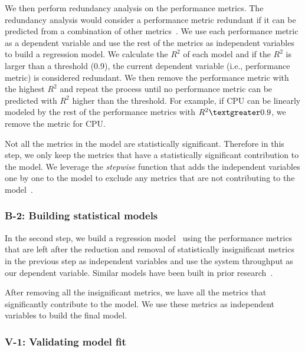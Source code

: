 \documentclass[smallextended]{svjour3}       %
\begin{document}
We then perform redundancy analysis on the performance metrics. The redundancy analysis would consider a performance metric redundant if it can be predicted from a combination of other metrics~\cite{harrell2001regression}. We use each performance metric as a dependent variable and use the rest of the metrics as independent variables to build a regression model. We calculate the $R^2$ of each model and if the $R^2$ is larger than a threshold (0.9)\cite{Syer2016}, the current dependent variable (i.e., performance metric) is considered redundant. We then remove the performance metric with the highest $R^2$ and repeat the process until no performance metric can be predicted with $R^2$ higher than the threshold. For example, if CPU can be linearly modeled by the rest of the performance metrics with $R^2\textgreater0.9$, we remove the metric for CPU.

Not all the metrics in the model are statistically significant. Therefore in this step, we only keep the metrics that have a statistically significant contribution to the model. We leverage the \textit{stepwise} function that adds the independent variables one by one to the model to exclude any metrics that are not contributing to the model~\cite{RInAction}. 

\subsubsection{B-2: Building statistical models}

In the second step, we build a regression model~\cite{freedman2009statistical} using the performance metrics that are left after the reduction and removal of statistically insignificant metrics in the previous step as independent variables and use the system throughput as our dependent variable. Similar models have been built in prior research~\cite{Cohen:2005:CIC:1095810.1095821,xiong2013vperfguard}.

After removing all the insignificant metrics, we have all the metrics that significantly contribute to the model. We use these metrics as independent variables to build the final model.

\subsubsection{V-1: Validating model fit}
\end{document}
